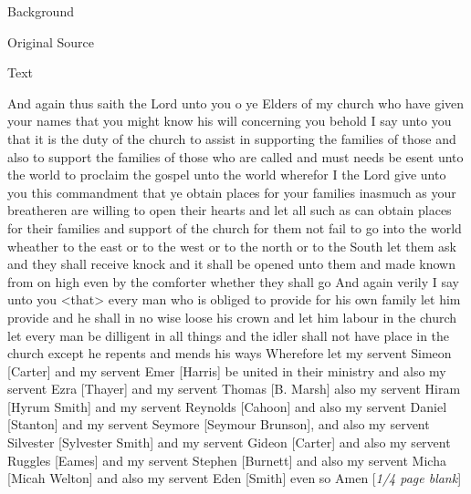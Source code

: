 			\begin{description}
				\item[Background]
			\end{description}
			
			
			\begin{description}
				\item[Original Source]
			\end{description}
			
			
			\begin{description}
				\item[Text]
			\end{description}
			
				And again thus saith the Lord unto you o ye Elders of my church who have given your names that you might know his will concerning you behold I say unto you that it is the duty of the church to assist in supporting the families of those and also to support the families of those who are called and must needs be esent unto the world to proclaim the gospel unto the world wherefor I the Lord give unto you this commandment that ye obtain places for your families inasmuch as your breatheren are willing to open their hearts and let all such as can obtain places for their families and support of the church for them not fail to go into the world wheather to the east or to the west or to the north or to the South let them ask and they shall receive knock and it shall be opened unto them and made known from on high even by the comforter whether they shall go And again verily I say unto you <that> every man who is obliged to provide for his own family let him provide and he shall in no wise loose his crown and let him labour in the church let every man be dilligent in all things and the idler shall not have place in the church except he repents and mends his ways Wherefore let my servent Simeon [Carter] and my servent Emer [Harris] be united in their ministry and also my servent Ezra [Thayer] and my servent Thomas [B. Marsh] also my servent Hiram [Hyrum Smith] and my servent Reynolds [Cahoon] and also my servent Daniel [Stanton] and my servent Seymore [Seymour Brunson], and also my servent Silvester [Sylvester Smith] and my servent Gideon [Carter] and also my servent Ruggles [Eames] and my servent Stephen [Burnett] and also my servent Micha [Micah Welton] and also my servent Eden [Smith] even so Amen [\textit{1/4 page blank}]
				
